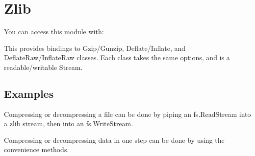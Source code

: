 \section{Zlib}

\begin{Shaded}
\begin{Highlighting}[]
\NormalTok{: } 
\end{Highlighting}
\end{Shaded}

You can access this module with:

\begin{Shaded}
\begin{Highlighting}[]
 \NormalTok{);}
\end{Highlighting}
\end{Shaded}

This provides bindings to Gzip/Gunzip, Deflate/Inflate, and
DeflateRaw/InflateRaw classes. Each class takes the same options, and is
a readable/writable Stream.

\subsection{Examples}

Compressing or decompressing a file can be done by piping an
fs.ReadStream into a zlib stream, then into an fs.WriteStream.

\begin{Shaded}
\begin{Highlighting}[]
 \NormalTok{();}
 \NormalTok{);}
 \NormalTok{(}\NormalTok{);}
 \NormalTok{(}\NormalTok{);}

\end{Highlighting}
\end{Shaded}

Compressing or decompressing data in one step can be done by using the
convenience methods.

